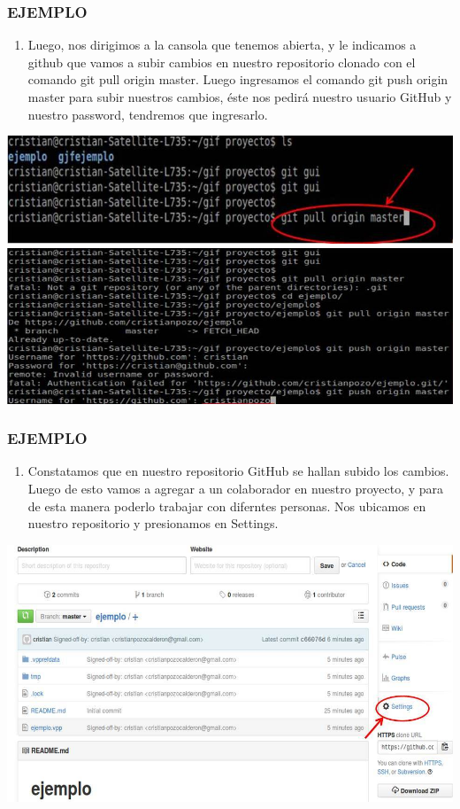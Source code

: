 \documentclass[8pt]{beamer}
\begin{document}
\begin{frame}
\frametitle{EJEMPLO}
\begin{enumerate}[13. ]
	\justifying
    \item Luego, nos dirigimos a la cansola que tenemos abierta, y le indicamos a github que vamos a subir cambios en nuestro repositorio clonado con el comando git pull origin master. Luego ingresamos el comando git push origin master para subir nuestros cambios, éste nos pedirá nuestro usuario GitHub y nuestro password, tendremos que ingresarlo.\\
\end{enumerate}
\begin{center}
\includegraphics[width=6 cm]{img/b20}\\
\includegraphics[width=6 cm]{img/b21}\\
\fontsize{6}{1}
\end{center}
\end{frame}

\begin{frame}
\frametitle{EJEMPLO}
\begin{enumerate}[14. ]
	\justifying
    \item Constatamos que en nuestro repositorio GitHub se hallan subido los cambios. Luego de esto vamos a agregar a un colaborador en nuestro proyecto, y para de esta manera poderlo trabajar con diferntes personas. Nos ubicamos en nuestro repositorio y presionamos en Settings.\\
\end{enumerate}
\begin{center}
\includegraphics[width=8 cm]{img/b23}\\
\fontsize{6}{1}
\end{center}
\end{frame}
\end{document}
